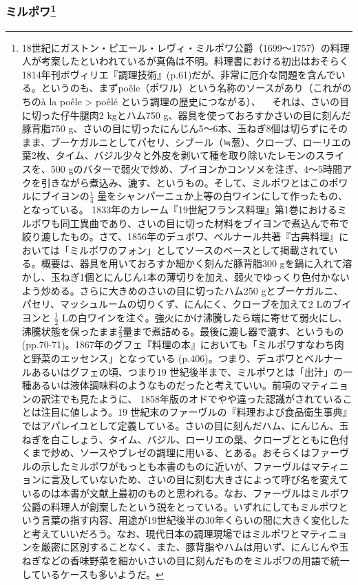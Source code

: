 \begin{recette}
{\subsubsection[ミルポワ]{\texorpdfstring{ミルポワ\footnote{18世紀にガストン・ピエール・レヴィ・ミルポワ公爵（1699〜1757）の料理人が考案したといわれているが真偽は不明。料理書における初出はおそらく1814年刊ボヴィリエ『調理技術』(p.61)だが、非常に厄介な問題を含んでいる。というのも、まずpoêle（ポワル）という名称のソースがあり（これがのちのà
  la poêle \textgreater{} poêlé という調理の歴史につながる）、 ~
  それは、さいの目に切った仔牛腿肉2 kgとハム750
  g、器具を使っておろすかさいの目に刻んだ豚背脂750
  g、さいの目に切ったにんじん5〜6本、玉ねぎ8個は切らずにそのまま、ブーケガルニとしてパセリ、シブール（≒葱）、クローブ、ローリエの葉2枚、タイム、バジル少々と外皮を剥いて種を取り除いたレモンのスライスを、500
  gのバターで弱火で炒め、ブイヨンかコンソメを注ぎ、4〜5時間アクを引きながら煮込み、漉す、というもの。そして、ミルポワとはこのポワルにブイヨンの\(\frac{1}{4}\)
  量をシャンパーニュか上等の白ワインにして作ったもの、となっている。
  1833年のカレーム『19世紀フランス料理』第1巻におけるミルポワも同工異曲であり、さいの目に切った材料をブイヨンで煮込んで布で絞り漉したもの。さて、1856年のデュボワ、ベルナール共著『古典料理』においては「ミルポワのフォン」としてソースのベースとして掲載されている。概要は、器具を用いておろすか細かく刻んだ豚背脂300
  gを鍋に入れて溶かし、玉ねぎ1個とにんじん1本の薄切りを加え、弱火でゆっくり色付かないよう炒める。さらに大きめのさいの目に切ったハム250
  gとブーケガルニ、パセリ、マッシュルームの切りくず、にんにく、クローブを加えて2
  Lのブイヨンと \(\frac{1}{2}\)
  Lの白ワインを注ぐ。強火にかけ沸騰したら端に寄せて弱火にし、沸騰状態を保ったまま\(\frac{2}{3}\)量まで煮詰める。最後に漉し器で漉す、というもの(pp.70-71)。1867年のグフェ『料理の本』においても「ミルポワすなわち肉と野菜のエッセンス」となっている
  (p.406)。つまり、デュボワとベルナールあるいはグフェの頃、つまり19
  世紀後半まで、ミルポワとは「出汁」の一種あるいは液体調味料のようなものだったと考えていい。前項のマティニョンの訳注でも見たように、
  1858年版のオドでやや違った認識がされていることは注目に値しよう。19
  世紀末のファーヴルの『料理および食品衛生事典』ではアパレイユとして定義している。さいの目に刻んだハム、にんじん、玉ねぎを白こしょう、タイム、バジル、ローリエの葉、クローブとともに色付くまで炒め、ソースやブレゼの調理に用いる、とある。おそらくはファーヴルの示したミルポワがもっとも本書のものに近いが、ファーヴルはマティニョンに言及していないため、さいの目に刻む大きさによって呼び名を変えているのは本書が文献上最初のものと思われる。なお、ファーヴルはミルポワ公爵の料理人が創案したという説をとっている。いずれにしてもミルポワという言葉の指す内容、用途が19世紀後半の30年くらいの間に大きく変化したと考えていいだろう。なお、現代日本の調理現場ではミルポワとマティニョンを厳密に区別することなく、また、豚背脂やハムは用いず、にんじんや玉ねぎなどの香味野菜を細かいさいの目に刻んだものをミルポワの用語で統一しているケースも多いようだ。}}{ミルポワ}}\label{mirepoix}}


\end{recette}

